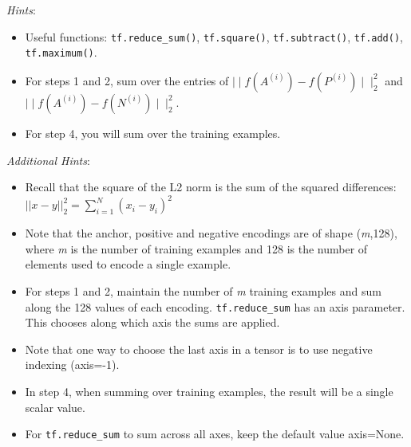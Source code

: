 \documentclass[11pt]{article}
\begin{document}
\emph{Hints}:

\begin{itemize}
\item
  Useful functions: \texttt{tf.reduce\_sum()}, \texttt{tf.square()},
  \texttt{tf.subtract()}, \texttt{tf.add()}, \texttt{tf.maximum()}.
\item
  For steps 1 and 2, sum over the entries of
  \(\mid \mid f(A^{(i)}) - f(P^{(i)}) \mid \mid_2^2\) and
  \(\mid \mid f(A^{(i)}) - f(N^{(i)}) \mid \mid_2^2\).
\item
  For step 4, you will sum over the training examples.
\end{itemize}

\emph{Additional Hints}:

\begin{itemize}
\item
  Recall that the square of the L2 norm is the sum of the squared
  differences: \(||x - y||_{2}^{2} = \sum_{i=1}^{N}(x_{i} - y_{i})^{2}\)
\item
  Note that the anchor, positive and negative encodings are of shape
  (\emph{m},128), where \emph{m} is the number of training examples and
  128 is the number of elements used to encode a single example.
\item
  For steps 1 and 2, maintain the number of \emph{m} training examples
  and sum along the 128 values of each encoding. \texttt{tf.reduce\_sum}
  has an axis parameter. This chooses along which axis the sums are
  applied.
\item
  Note that one way to choose the last axis in a tensor is to use
  negative indexing (axis=-1).
\item
  In step 4, when summing over training examples, the result will be a
  single scalar value.
\item
  For \texttt{tf.reduce\_sum} to sum across all axes, keep the default
  value axis=None.
\end{itemize}
\end{document}

